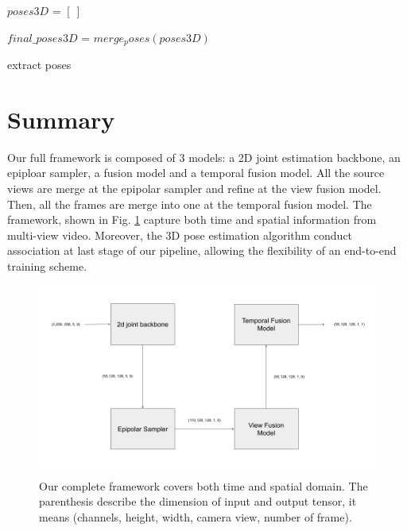 \begin{algorithm}
	\SetAlgoLined
	$poses3D$ = $\left[\:\right]$ \; 
	
	
	$final\_poses3D$ = $merge_poses(poses3D)$
	\caption{extract poses}\label{alg:overview-3d-pose}
\end{algorithm}

\section{Summary}
Our full framework is composed of 3 models: a 2D joint estimation backbone, an epiploar sampler, a fusion model and a temporal fusion model. All the source views are merge at the epipolar sampler and refine at the view fusion model. Then, all the frames are merge into one at the temporal fusion model. The framework, shown in Fig. \ref{fig:full-framework} capture both time and spatial information from multi-view video. Moreover, the 3D pose estimation algorithm conduct association at last stage of our pipeline, allowing the flexibility of an end-to-end training scheme.  
\begin{figure}
	\centering
	\includegraphics[width=0.7\columnwidth]{figures/ch4/full-model.png}
	\caption{Our complete framework covers both time and spatial domain. The parenthesis describe the dimension of input and output tensor, it means (channels, height, width, camera view, number of frame).}
	\label{fig:full-framework}
\end{figure}

